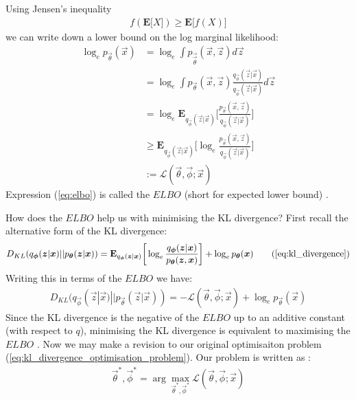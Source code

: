 Using Jensen's inequality
\begin{align}
f(\mathbf{E}\big[X\big]) \geq \mathbf{E}\big[ f(X) \big]
\end{align}
we can write down a lower bound on the log marginal likelihood:
\begin{align}
\log_ep_{\vec{\theta}}(\vec{x}) &= \log_e\int p_{\vec{\vec{\theta}}}(\vec{x}, \vec{z})d\vec{z} \\
&= \log_e\int p_{\vec{\theta}}(\vec{x}, \vec{z}) \frac{q_{\vec{\phi}}(\vec{z}|\vec{x})}{q_{\vec{\phi}}(\vec{z}|\vec{x})} d\vec{z} \\
&= \log_e\mathbf{E}_{q_{\vec{\phi}}(\vec{z}|\vec{x})}\bigg[  \frac{p_{\vec{\theta}}(\vec{x}, \vec{z})}{q_{\vec{\phi}}(\vec{z}|\vec{x})} \bigg] \\
&\geq \mathbf{E}_{q_{\vec{\phi}}(\vec{z}|\vec{x})}\bigg[  \log_e\frac{p_{\vec{\theta}}(\vec{x}, \vec{z})}{q_{\vec{\phi}}(\vec{z}|\vec{x})} \bigg] \label{eq:elbo}\\
&:= \mathcal{L}(\vec{\theta}, \vec{\phi}; \vec{x})
\end{align}
Expression (\ref{eq:elbo}) is called the $ELBO$ (short for expected lower bound) \cite{Blei2011, Kingma2014}.

How does the $ELBO$ help us with minimising the KL divergence? First recall the alternative form of the KL divergence:
\begin{align}
D_{KL}(q_{\vec{\phi}}(\vec{z}|\vec{x})||p_{\vec{\theta}}(\vec{z}|\vec{x})) = \mathbf{E}_{q_{\vec{\phi}}(\vec{z}|\vec{x})}\bigg[\log_{e}\frac{q_{\vec{\phi}}(\vec{z}|\vec{x})}{{p_{\vec{\theta}}(\vec{z},\vec{x})}}\bigg] + \log_ep_{\vec{\theta}}(\vec{x})
\tag{\ref{eq:kl_divergence}}
\end{align}
Writing this in terms of the $ELBO$ we have:
\begin{align}
D_{KL}(q_{\vec{\phi}}(\vec{z}|\vec{x})||p_{\vec{\theta}}(\vec{z}|\vec{x})) = -\mathcal{L}(\vec{\theta}, \vec{\phi}; \vec{x}) + \log_ep_{\vec{\theta}}(\vec{x})
\end{align}
Since the KL divergence is the negative of the $ELBO$ up to an additive constant (with respect to $q$), minimising the KL divergence is equivalent to maximising the $ELBO$ \cite{Blei2016}. Now we may make a revision to our original optimisaiton problem (\ref{eq:kl_divergence_optimisation_problem}). Our problem is written as \cite{Li2016}:
\begin{align}
\vec{\theta}^*, \vec{\phi}^* = \arg\max_{\vec{\theta}^*, \vec{\phi}^*} \mathcal{L}(\vec{\theta}, \vec{\phi}; \vec{x})
\label{eq:elbo_optimisation_problem}
\end{align}

